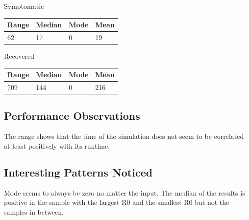 \documentclass{article}
\begin{document}
Symptomatic
\newline
\begin{tabular}{| l | l | l | l |}
  \hline\hline
  Range & Median & Mode & Mean \\
  \hline
  62 & 17 & 0 & 19 \\
  \hline
\end{tabular} 

Recovered
\newline
\begin{tabular}{| l | l | l | l |}
  \hline\hline
  Range & Median & Mode & Mean \\
  \hline
  709 & 144 & 0 & 216 \\
  \hline
\end{tabular} 

\subsection{Performance Observations}
The range shows that the time of the simulation does not seem to be correlated at least positively with its runtime.
\subsection{Interesting Patterns Noticed}
Mode seems to always be zero no matter the input. The median of the results is positive in the sample with the largest R0 and the smallest R0 but not the samples in between.


\printbibliography
\end{document}
